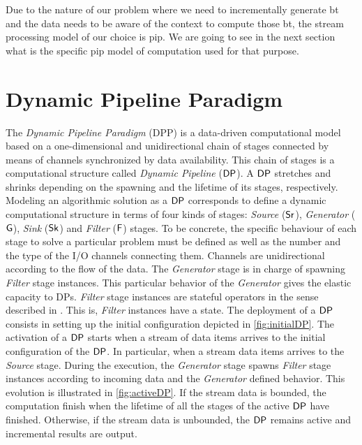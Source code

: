 Due to the nature of our problem where we need to incrementally generate \acrlong{bt} and the data needs to be aware of the context to compute those \acrshort{bt}, the stream processing model of our choice is \acrshort{pip}.
We are going to see in the next section what is the specific \acrshort{pip} model of computation used for that purpose.

\section{Dynamic Pipeline Paradigm}\label{sec:dp}
The \textit{Dynamic Pipeline Paradigm} (DPP) \cite{dpdef} is a data-driven computational model  based on a one-dimensional and unidirectional chain of stages connected by means of channels synchronized by data availability. 
This chain of stages is a computational structure called \textit{Dynamic Pipeline} ($\mathsf{DP}$). A $\mathsf{DP}$ stretches and shrinks depending on the spawning and the lifetime of its stages, respectively. Modeling an algorithmic 
solution as a $\mathsf{DP}$ corresponds to define a dynamic computational structure  in terms of four kinds of stages:  \textit{Source} ($\mathsf{Sr}$),  \textit{Generator} ($\mathsf{G}$),  \textit{Sink} ($\mathsf{Sk}$) and \textit{Filter} ($\mathsf{F}$) stages. 
To be concrete, the specific  behaviour of each stage to solve a particular problem must be defined as well as the number and the type of the I/O channels connecting them. Channels are unidirectional according to the flow of the data. 
The \textit{Generator} stage is in charge of spawning \textit{Filter} stage instances. This particular behavior of the \textit{Generator}  gives the elastic capacity to DPs. \textit{Filter} stage instances are stateful operators in the 
sense described in \cite{HR19}. This is, \textit{Filter} instances have a state.  
The deployment of a $\mathsf{DP}$ consists in setting up the initial configuration depicted in \autoref{fig:initialDP}. The activation of a $\mathsf{DP}$ starts when a stream of data items arrives to the initial configuration of the $\mathsf{DP}$. 
In particular, when a stream data items arrives to the \textit{Source} stage. During the execution, the  \textit{Generator} stage spawns \textit{Filter} stage instances according to incoming data and the \textit{Generator} defined behavior. 
This evolution is illustrated in  \autoref{fig:activeDP}. If the stream  data is bounded, the computation finish when the lifetime of all the stages of the active $\mathsf{DP}$ have finished. Otherwise, if the stream data is unbounded, 
the $\mathsf{DP}$ remains active and incremental results are output. 

